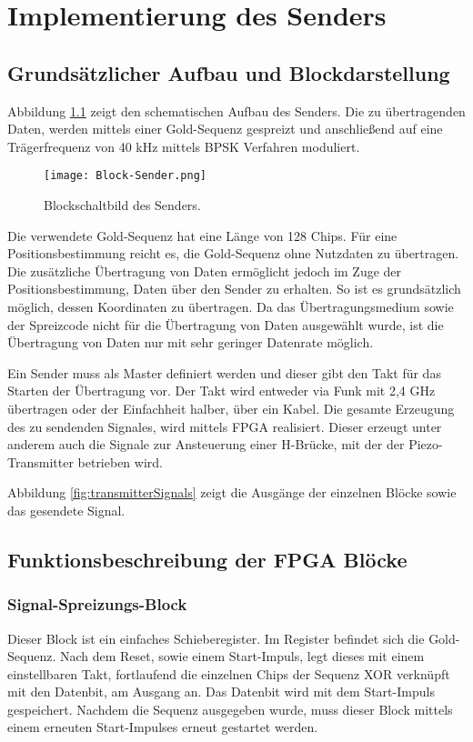 \chapter{Implementierung des Senders}
\label{cha:implementierungSender}

\section{Grundsätzlicher Aufbau und Blockdarstellung}
Abbildung \ref{fig:BlockSender} zeigt den schematischen Aufbau des Senders. Die zu übertragenden Daten, werden mittels einer Gold-Sequenz gespreizt und anschließend auf eine Trägerfrequenz von 40 kHz mittels BPSK Verfahren moduliert.

\begin{figure}[H]
\centering
\texttt{[image: Block-Sender.png]}
\caption{Blockschaltbild des Senders.}
\label{fig:BlockSender}
\end{figure}

Die verwendete Gold-Sequenz hat eine Länge von 128 Chips. Für eine Positionsbestimmung reicht es, die Gold-Sequenz ohne Nutzdaten zu übertragen. Die zusätzliche Übertragung von Daten ermöglicht jedoch im Zuge der Positionsbestimmung, Daten über den Sender zu erhalten. So ist es grundsätzlich möglich, dessen Koordinaten zu übertragen. Da das Übertragungsmedium sowie der Spreizcode nicht für die Übertragung von Daten ausgewählt wurde, ist die Übertragung von Daten nur mit sehr geringer Datenrate möglich.

Ein Sender muss als Master definiert werden und dieser gibt den Takt für das Starten der Übertragung vor. Der Takt wird entweder via Funk mit 2,4 GHz übertragen oder der Einfachheit halber, über ein Kabel. Die gesamte Erzeugung des zu sendenden Signales, wird mittels FPGA realisiert. Dieser erzeugt unter anderem auch die Signale zur Ansteuerung einer H-Brücke, mit der der Piezo-Transmitter betrieben wird. 

Abbildung \ref{fig:transmitterSignals} zeigt die Ausgänge der einzelnen Blöcke sowie das gesendete Signal.

\section{Funktionsbeschreibung der FPGA Blöcke}
\subsection{Signal-Spreizungs-Block}
Dieser Block ist ein einfaches Schieberegister. Im Register befindet sich die Gold-Sequenz. Nach dem Reset, sowie einem Start-Impuls, legt dieses mit einem einstellbaren Takt, fortlaufend die einzelnen Chips der Sequenz XOR verknüpft mit den Datenbit, am Ausgang an. Das Datenbit wird mit dem Start-Impuls gespeichert. Nachdem die Sequenz ausgegeben wurde, muss dieser Block mittels einem erneuten Start-Impulses erneut gestartet werden.

